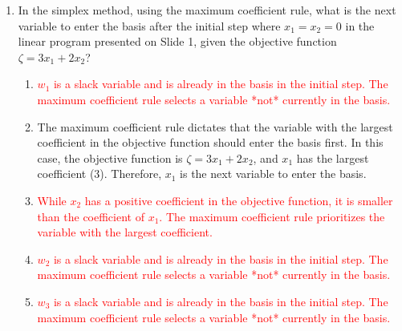 \documentclass{article}%
\newcommand{\incorrect}[1]{\textcolor{red}{#1}}
\begin{document}
\begin{enumerate}
\begin{enumerate}
\begin{enumerate}
\item \incorrect{This constraint gives $x_1 \le 8$, which is less restrictive than $x_1 \le 5$.}%
\item With $x_2 = 0$, the constraint becomes $2x_1 \le 10$, which implies $x_1 \le 5$. This is the most restrictive constraint on $x_1$ in this case.%
\item \incorrect{This constraint is always satisfied since $x_1$ is non-negative.}%
\item \incorrect{This constraint is always satisfied since $x_2$ is non-negative and is already set to 0.}%
\end{enumerate}%
\vspace{0.5em}%
\end{enumerate}%
\item In the simplex method, using the maximum coefficient rule, what is the next variable to enter the basis after the initial step where $x_1 = x_2 = 0$ in the linear program presented on Slide 1, given the objective function $\zeta = 3x_1 + 2x_2$?%
\begin{enumerate}%
\item \incorrect{$w_1$ is a slack variable and is already in the basis in the initial step.  The maximum coefficient rule selects a variable *not* currently in the basis.}%
\item The maximum coefficient rule dictates that the variable with the largest coefficient in the objective function should enter the basis first. In this case, the objective function is $\zeta = 3x_1 + 2x_2$, and $x_1$ has the largest coefficient (3). Therefore, $x_1$ is the next variable to enter the basis.%
\item \incorrect{While $x_2$ has a positive coefficient in the objective function, it is smaller than the coefficient of $x_1$. The maximum coefficient rule prioritizes the variable with the largest coefficient.}%
\item \incorrect{$w_2$ is a slack variable and is already in the basis in the initial step. The maximum coefficient rule selects a variable *not* currently in the basis.}%
\item \incorrect{$w_3$ is a slack variable and is already in the basis in the initial step. The maximum coefficient rule selects a variable *not* currently in the basis.}%
\end{enumerate}%
\vspace{1em}%
\end{enumerate}

%
\end{document}
